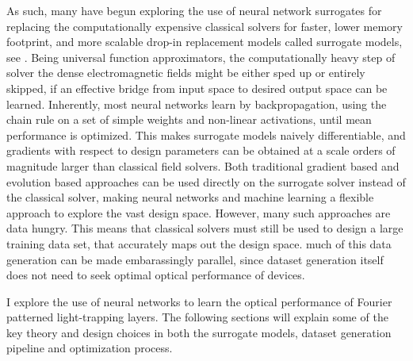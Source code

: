As such, many have begun exploring the use of neural network surrogates for replacing the computationally expensive classical solvers for faster, lower memory footprint, and more scalable drop-in replacement models called surrogate models, see \cite{Jiang2021}.
Being universal function approximators, the computationally heavy step of solver the dense electromagnetic fields might be either sped up or entirely skipped, if an effective bridge from input space to desired output space can be learned.
Inherently, most neural networks learn by backpropagation, using the chain rule on a set of simple weights and non-linear activations, until mean performance is optimized. This makes surrogate models naively differentiable, and gradients with respect to design parameters can be obtained at a scale orders of magnitude larger
than classical field solvers. Both traditional gradient based and evolution based approaches can be used directly on the surrogate solver instead of the classical solver, making neural networks and machine learning a flexible approach to explore the vast design space.
However, many such approaches are data hungry. This means that classical solvers must still be used to design a large training data set, that accurately maps out the design space.
much of this data generation can be made embarassingly parallel, since dataset generation itself does not need to seek optimal optical performance of devices.

I explore the use of neural networks to learn the optical performance of Fourier patterned light-trapping layers. The following sections will explain some of the key theory and design choices in both the surrogate models, dataset generation pipeline and optimization process.
